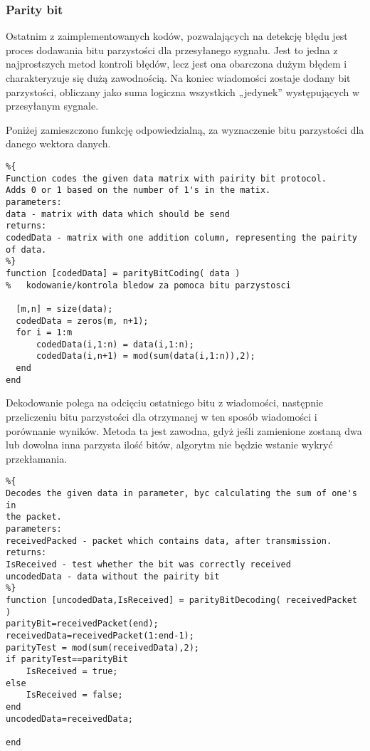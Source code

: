 \documentclass{article}
\begin{document}
\subsubsection{Parity bit}

Ostatnim z zaimplementowanych kodów, pozwalających na detekcję błędu jest proces dodawania bitu parzystości dla przesyłanego sygnału. Jest to jedna z najprostszych metod kontroli błędów, lecz jest ona obarczona dużym błędem i charakteryzuje się dużą zawodnością.
Na koniec wiadomości zostaje dodany bit parzystości, obliczany jako suma logiczna wszystkich „jedynek” występujących w przesyłanym sygnale.

\vspace{2mm}
\noindent
Poniżej zamieszczono funkcję odpowiedzialną, za wyznaczenie bitu parzystości dla danego wektora danych.

\newpage

\begin{verbatim}
%{
Function codes the given data matrix with pairity bit protocol.
Adds 0 or 1 based on the number of 1's in the matix.
parameters:
data - matrix with data which should be send
returns:
codedData - matrix with one addition column, representing the pairity
of data.
%}
function [codedData] = parityBitCoding( data )
%   kodowanie/kontrola bledow za pomoca bitu parzystosci

  [m,n] = size(data);
  codedData = zeros(m, n+1);
  for i = 1:m
      codedData(i,1:n) = data(i,1:n);
      codedData(i,n+1) = mod(sum(data(i,1:n)),2);
  end
end
\end{verbatim}

 Dekodowanie polega na odcięciu ostatniego bitu z wiadomości, następnie przeliczeniu bitu parzystości dla otrzymanej w ten sposób wiadomości i porównanie wyników. Metoda ta jest zawodna, gdyż jeśli zamienione zostaną dwa lub dowolna inna parzysta ilość bitów, algorytm nie będzie wstanie wykryć przekłamania. 
 
\begin{verbatim}
%{
Decodes the given data in parameter, byc calculating the sum of one's in
the packet.
parameters:
receivedPacked - packet which contains data, after transmission.
returns:
IsReceived - test whether the bit was correctly received
uncodedData - data without the pairity bit
%}
function [uncodedData,IsReceived] = parityBitDecoding( receivedPacket )
parityBit=receivedPacket(end);
receivedData=receivedPacket(1:end-1);
parityTest = mod(sum(receivedData),2);
if parityTest==parityBit
    IsReceived = true;
else
    IsReceived = false;
end
uncodedData=receivedData;

end
\end{verbatim}
\end{document}
